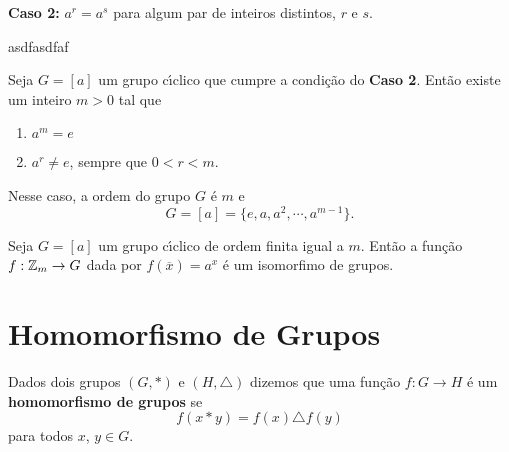 \textbf{Caso 2:} $a^r = a^s$ para algum par de inteiros distintos, $r$ e $s$.

\begin{exemplo}
	asdfasdfaf
\end{exemplo}

\begin{proposicao}
    Seja $G = [a]$ um grupo c{\'\i}clico que cumpre a condi\c{c}\~ao do \textbf{Caso 2}. Ent\~ao existe um inteiro $m > 0$ tal que
    \begin{enumerate}
        \item[i)] $a^m = e$

        \item[ii)] $a^r \ne e$, sempre que $0 < r < m$.
    \end{enumerate}
    Nesse caso, a ordem do grupo $G$ \'e $m$ e
    \[
        G = [a] = \{e, a, a^2, \cdots, a^{m - 1}\}.
    \]
\end{proposicao}

\begin{corolario}
    Seja $G = [a]$ um grupo c{\'\i}clico de ordem finita igual a $m$. Ent\~ao a fun\c{c}\~ao $f : \mathbb{Z}_m \to G$ dada por $f(\overline{x}) = a^x$ \'e um isomorfimo de grupos.
\end{corolario}

\section{Homomorfismo de Grupos} %
\label{sec:homomorfismo_de_grupos}


\begin{definicao}
	Dados dois grupos $(G, *)$ e $(H,\triangle)$ dizemos que uma fun\c{c}\~ao $f : G \to H$ \'e um \textbf{homomorfismo de grupos} se
	\[
		f(x * y) = f(x)\triangle f(y)
	\]
	para todos $x$, $y \in G$.
\end{definicao}

